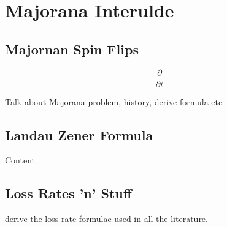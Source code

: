 
\chapter{Majorana Interulde} %

\label{ch:majinter} %


\section{Majornan Spin Flips}
\begin{equation}
    \frac{\partial}{\partial t} \label{eq:Majprob}
\end{equation}

Talk about Majorana problem, history, derive formula etc


\section{Landau Zener Formula}

Content

\section{Loss Rates 'n' Stuff}

derive the loss rate formulae used in all the literature.